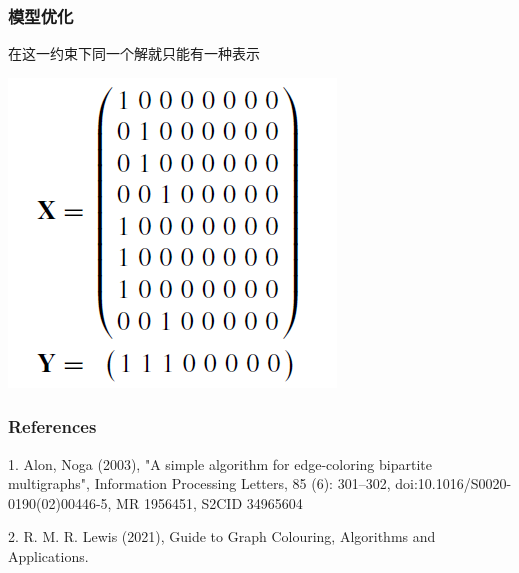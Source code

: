 \documentclass[UTF8]{beamer}
\begin{document}
\begin{frame}
  \frametitle{模型优化}

  在这一约束下同一个解就只能有一种表示
  \begin{center}
    \includegraphics[scale=0.5]{figs/sol3.png}
  \end{center}
\end{frame}

\begin{frame}
  \frametitle{References}

  1. Alon, Noga (2003), "A simple algorithm for edge-coloring bipartite multigraphs", Information Processing Letters, 85 (6): 301–302, doi:10.1016/S0020-0190(02)00446-5, MR 1956451, S2CID 34965604
  
  2. R. M. R. Lewis (2021), Guide to Graph Colouring,
  Algorithms and Applications. 

\end{frame}
 
\end{document}
